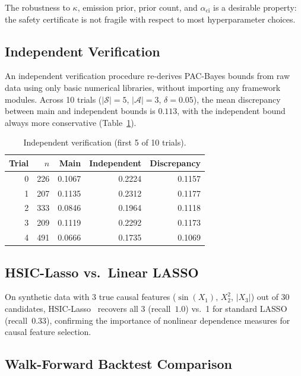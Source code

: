 \documentclass[11pt]{article}
\newcommand{\cA}{\mathcal{A}}
\newcommand{\cS}{\mathcal{S}}
\begin{document}
The robustness to $\kappa$, emission prior, prior count, and
$\alpha_{\mathrm{ci}}$ is a desirable property: the safety certificate
is not fragile with respect to most hyperparameter choices.

\subsection{Independent Verification}

An independent verification procedure re-derives PAC-Bayes bounds
from raw data using only basic numerical libraries, without importing
any framework modules.  Across 10 trials ($|\cS|{=}5$, $|\cA|{=}3$,
$\delta{=}0.05$), the mean discrepancy between main and independent
bounds is $0.113$, with the independent bound always more conservative
(Table~\ref{tab:indep}).

\begin{table}[t]
\centering
\caption{Independent verification (first 5 of 10
trials).}\label{tab:indep}
\small
\begin{tabular}{@{}rrrrr@{}}
\toprule
\textbf{Trial} & $n$ & \textbf{Main}
  & \textbf{Independent} & \textbf{Discrepancy} \\
\midrule
0 & 226 & 0.1067 & 0.2224 & 0.1157 \\
1 & 207 & 0.1135 & 0.2312 & 0.1177 \\
2 & 333 & 0.0846 & 0.1964 & 0.1118 \\
3 & 209 & 0.1119 & 0.2292 & 0.1173 \\
4 & 491 & 0.0666 & 0.1735 & 0.1069 \\
\bottomrule
\end{tabular}
\end{table}

\subsection{HSIC-Lasso vs.\ Linear LASSO}

On synthetic data with 3 true causal features ($\sin(X_1)$, $X_2^2$,
$|X_3|$) out of 30 candidates, HSIC-Lasso~\cite{yamada2014high}
recovers all 3 (recall~$1.0$) vs.\ 1 for standard LASSO
(recall~$0.33$), confirming the importance of nonlinear dependence
measures for causal feature selection.


\subsection{Walk-Forward Backtest Comparison}\label{sec:backtest}
\end{document}
